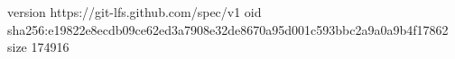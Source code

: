 version https://git-lfs.github.com/spec/v1
oid sha256:e19822e8ecdb09ce62ed3a7908e32de8670a95d001c593bbc2a9a0a9b4f17862
size 174916
